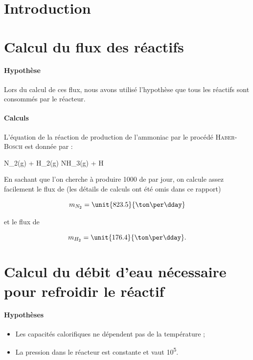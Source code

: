 
\usepackage[numbered, framed]{mcode}

\section{Introduction}

\section{Calcul du flux des réactifs}
\paragraph{Hypothèse}
Lors du calcul de ces flux, nous avons utilisé l'hypothèse que tous les réactifs sont 
consommés par le réacteur.

\paragraph{Calculs}
L'équation de la réaction de production de l'ammoniac par le procédé \textsc{Haber-Bosch} est donnée par :

	\begin{chemmath}
			N_2(g) + H_2(g) \longrightarrow NH_3(g) + \Delta H
 	\end{chemmath}
	
En sachant que l'on cherche à produire \unit{1000}{\ton} de  par jour, 
on calcule assez facilement le flux de  (les détails de calculs ont été omis
dans ce rapport)

	$$m_{N_2} = \unit{823.5}{\ton\per\dday}$$

et le flux de 

	$$m_{H_2} = \unit{176.4}{\ton\per\dday}.$$

\section{Calcul du débit d'eau nécessaire pour refroidir le réactif}
\paragraph{Hypothèses}
\begin{itemize}
	\item Les capacités calorifiques ne dépendent pas de la température ;
	\item La pression dans le réacteur est constante et vaut \unit{10^5}{\pascal}.
\end{itemize}

